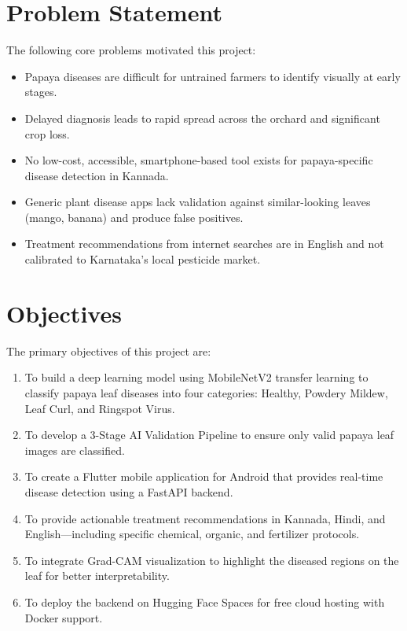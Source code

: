 \documentclass[12pt,a4paper]{report}
\begin{document}
\section{Problem Statement}
The following core problems motivated this project:
\begin{itemize}
    \item Papaya diseases are difficult for untrained farmers to identify visually at early stages.
    \item Delayed diagnosis leads to rapid spread across the orchard and significant crop loss.
    \item No low-cost, accessible, smartphone-based tool exists for papaya-specific disease detection in Kannada.
    \item Generic plant disease apps lack validation against similar-looking leaves (mango, banana) and produce false positives.
    \item Treatment recommendations from internet searches are in English and not calibrated to Karnataka's local pesticide market.
\end{itemize}

\section{Objectives}
The primary objectives of this project are:
\begin{enumerate}
    \item To build a deep learning model using MobileNetV2 transfer learning to classify papaya leaf diseases into four categories: Healthy, Powdery Mildew, Leaf Curl, and Ringspot Virus.
    \item To develop a 3-Stage AI Validation Pipeline to ensure only valid papaya leaf images are classified.
    \item To create a Flutter mobile application for Android that provides real-time disease detection using a FastAPI backend.
    \item To provide actionable treatment recommendations in Kannada, Hindi, and English---including specific chemical, organic, and fertilizer protocols.
    \item To integrate Grad-CAM visualization to highlight the diseased regions on the leaf for better interpretability.
    \item To deploy the backend on Hugging Face Spaces for free cloud hosting with Docker support.
\end{enumerate}
\end{document}

